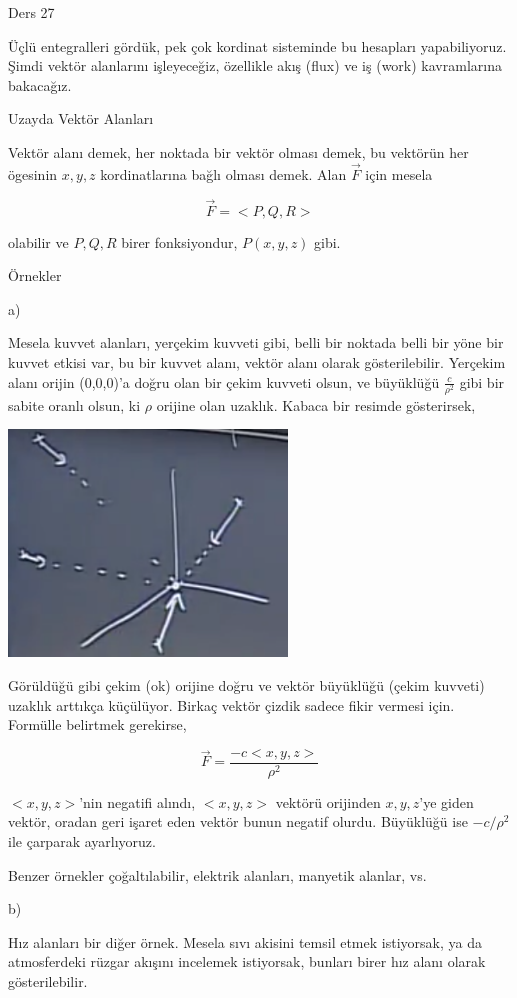 \documentclass[12pt,fleqn]{article}\usepackage{../../common}
\begin{document}
Ders 27

Üçlü entegralleri gördük, pek çok kordinat sisteminde bu hesapları
yapabiliyoruz. Şimdi vektör alanlarını işleyeceğiz, özellikle akış (flux)
ve iş (work) kavramlarına bakacağız. 

Uzayda Vektör Alanları

Vektör alanı demek, her noktada bir vektör olması demek, bu vektörün
her ögesinin $x,y,z$ kordinatlarına bağlı olması demek. Alan $\vec{F}$
için mesela 

$$
\vec{F} = < P,Q,R >
$$

olabilir ve $P,Q,R$ birer fonksiyondur, $P(x,y,z)$ gibi. 

Örnekler

a)

Mesela kuvvet alanları, yerçekim kuvveti gibi, belli bir noktada belli
bir yöne bir kuvvet etkisi var, bu bir kuvvet alanı, vektör alanı olarak
gösterilebilir. Yerçekim alanı orijin (0,0,0)'a doğru olan bir çekim kuvveti
olsun, ve büyüklüğü $\frac{c}{\rho^2}$ gibi bir sabite oranlı olsun, ki
$\rho$ orijine olan uzaklık. Kabaca bir resimde gösterirsek,

\includegraphics[width=20em]{calc_multi_27_01.png}

Görüldüğü gibi çekim (ok) orijine doğru ve vektör büyüklüğü (çekim kuvveti)
uzaklık arttıkça küçülüyor. Birkaç vektör çizdik sadece fikir vermesi
için. Formülle belirtmek gerekirse,

$$
\vec{F} = \frac{-c < x,y,z >}{\rho^2}
$$

$< x,y,z >$'nin negatifi alındı, $< x,y,z >$ vektörü orijinden $x,y,z$'ye giden
vektör, oradan geri işaret eden vektör bunun negatif olurdu. Büyüklüğü ise
$-c / \rho^2$ ile çarparak ayarlıyoruz. 

Benzer örnekler çoğaltılabilir, elektrik alanları, manyetik alanlar, vs.

b) 

Hız alanları bir diğer örnek. Mesela sıvı akisini temsil etmek istiyorsak,
ya da atmosferdeki rüzgar akışını incelemek istiyorsak, bunları birer hız alanı
olarak gösterilebilir.
\end{document}
